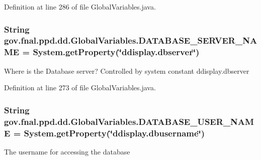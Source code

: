 Definition at line 286 of file Global\-Variables.\-java.

\hypertarget{classgov_1_1fnal_1_1ppd_1_1dd_1_1GlobalVariables_a84bb07dcee9c961579282f50a5031c0e}{
\subsubsection[{D\-A\-T\-A\-B\-A\-S\-E\-\_\-\-S\-E\-R\-V\-E\-R\-\_\-\-N\-A\-M\-E}]{\setlength{\rightskip}{0pt plus 5cm}String gov.\-fnal.\-ppd.\-dd.\-Global\-Variables.\-D\-A\-T\-A\-B\-A\-S\-E\-\_\-\-S\-E\-R\-V\-E\-R\-\_\-\-N\-A\-M\-E = System.\-get\-Property(\char`\"{}ddisplay.\-dbserver\char`\"{})\hspace{0.3cm}{\ttfamily [static]}}}\label{classgov_1_1fnal_1_1ppd_1_1dd_1_1GlobalVariables_a84bb07dcee9c961579282f50a5031c0e}
Where is the Database server? Controlled by system constant ddisplay.\-dbserver 

Definition at line 273 of file Global\-Variables.\-java.

\hypertarget{classgov_1_1fnal_1_1ppd_1_1dd_1_1GlobalVariables_a1b5c1519d1964bf42b3fe4908ae6d444}{
\subsubsection[{D\-A\-T\-A\-B\-A\-S\-E\-\_\-\-U\-S\-E\-R\-\_\-\-N\-A\-M\-E}]{\setlength{\rightskip}{0pt plus 5cm}String gov.\-fnal.\-ppd.\-dd.\-Global\-Variables.\-D\-A\-T\-A\-B\-A\-S\-E\-\_\-\-U\-S\-E\-R\-\_\-\-N\-A\-M\-E = System.\-get\-Property(\char`\"{}ddisplay.\-dbusername\char`\"{})\hspace{0.3cm}{\ttfamily [static]}}}\label{classgov_1_1fnal_1_1ppd_1_1dd_1_1GlobalVariables_a1b5c1519d1964bf42b3fe4908ae6d444}
The username for accessing the database 

